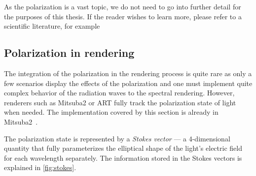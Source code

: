 As the polarization is a vast topic, we do not need to go into further detail for the purposes of this thesis. If the reader wishes to learn more, please refer to a scientific literature, for example \citet{kliger2012polarized}

\subsection{Polarization in rendering}
The integration of the polarization in the rendering process is quite rare as only a few scenarios display the effects of the polarization and one must implement quite complex behavior of the radiation waves to the spectral rendering. However, renderers such as Mitsuba2 or ART fully track the polarization state of light when needed. The implementation covered by this section is already in Mitsuba2~\cite{mitsubaWeb}.

The polarization state is represented by a \emph{Stokes vector} --- a 4-dimensional quantity that fully parameterizes the elliptical shape of the light's electric field for each wavelength separately. The information stored in the Stokes vectors is explained in \autoref{fig:stokes}.


